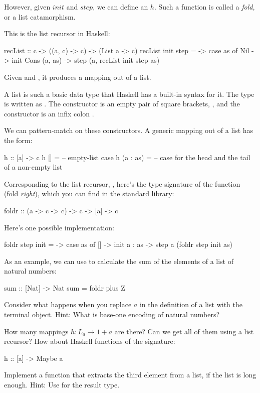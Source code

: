 \documentclass[DaoFP]{subfiles}
\begin{document}
However, given $\mathit{init}$ and $\mathit{step}$, we can define an $h$. Such a function is called a \emph{fold}, or a list catamorphism. 

This is the list recursor in Haskell:
\begin{haskell}
recList :: c -> ((a, c) -> c) -> (List a -> c)
recList init step = \as ->
  case as of 
    Nil          -> init
    Cons (a, as) -> step (a, recList init step as)
\end{haskell}
Given  and , it produces a mapping out of a list.

A list is such a basic data type that Haskell has a built-in syntax for it. The type  is written as \hask{[a]}. The  constructor is an empty pair of square brackets, \hask{[]}, and the  constructor is an infix colon \hask{(:)}.

We can pattern-match on these constructors. A generic mapping out of a list has the form:
\begin{haskell}
h :: [a] -> c
h []      = -- empty-list case
h (a : as) = -- case for the head and the tail of a non-empty list
\end{haskell}

Corresponding to the list recursor, , here's the type signature of the function  (fold \emph{right}), which you can find in the standard library:
\begin{haskell}
foldr :: (a -> c -> c) -> c -> [a] -> c
\end{haskell}
Here's one possible implementation:
\begin{haskell}
foldr step init = \as ->
  case as of
    [] -> init
    a : as -> step a (foldr step init as)
\end{haskell}

As an example, we can use  to calculate the sum of the elements of a list of natural numbers:
\begin{haskell}
sum :: [Nat] -> Nat
sum = foldr plus Z
\end{haskell}


\begin{exercise}
Consider what happens when you replace $a$ in the definition of a list with the terminal object. Hint: What is base-one encoding of natural numbers?
\end{exercise}
\begin{exercise}
How many mappings $h \colon L_a \to 1 + a$ are there? Can we get all of them using a list recursor? How about Haskell functions of the signature:
\begin{haskell}
h :: [a] -> Maybe a
\end{haskell}
\end{exercise}
\begin{exercise}
Implement a function that extracts the third element from a list, if the list is long enough. Hint: Use  for the result type.
\end{exercise}
\end{document}

